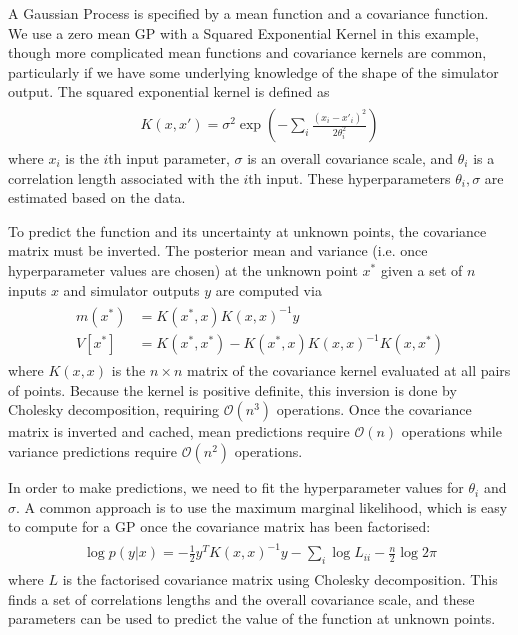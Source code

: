 \documentclass[openacc]{rstransa}%
\begin{document}
A Gaussian Process is specified by a mean function and a covariance function.
We use a zero mean GP with a Squared Exponential Kernel in this
example, though more complicated mean functions and covariance kernels are common, particularly
if we have some underlying knowledge of the shape of the simulator output.
The squared exponential kernel is defined as
\begin{align}\label{sqexp}
\begin{split}
K(x, x') = \sigma^2 \exp\left(-\sum_i \frac{(x_i - x'_i)^2}{2 \theta_i^2}\right)
\end{split}
\end{align}
where $x_i$ is the $i$th input parameter, $\sigma$ is an overall covariance scale, and $\theta_i$
is a correlation length associated with the $i$th input. These hyperparameters $\theta_i, \sigma$
are estimated based on the data.

To predict the function and its uncertainty at unknown points, the covariance matrix must be inverted.
The posterior mean and variance (i.e. once hyperparameter values are chosen) at the unknown point
$x^*$ given a set of $n$ inputs $x$ and simulator outputs $y$ are computed via
\begin{align}\label{predict}
\begin{split}
m(x^*) &= K(x^*, x) K(x, x)^{-1} y \\
V[x^*] &= K(x^*, x^*) - K(x^*, x) K(x, x)^{-1} K(x, x^*)
\end{split}
\end{align}
where $K(x,x)$ is the $n \times n$ matrix of the covariance kernel evaluated at all pairs of points.
Because the kernel is positive definite, this inversion is done by Cholesky decomposition, requiring
$\mathcal O(n^3)$ operations. Once the covariance matrix is inverted and cached, mean predictions require $\mathcal O(n)$
operations while variance predictions require $\mathcal O(n^2)$ operations.

In order to make predictions, we need to fit the hyperparameter values for $\theta_i$ and $\sigma$.
A common approach is to use the maximum marginal likelihood, which is easy to compute for a GP once
the covariance matrix has been factorised:
\begin{align}\label{loglike}
\begin{split}
\log p(y|x) = -\frac{1}{2} y^T K(x, x)^{-1} y - \sum_i \log L_{ii} - \frac{n}{2}\log 2\pi
\end{split}
\end{align}
where $L$ is the factorised covariance matrix using Cholesky decomposition.
This finds a set of correlations lengths and the overall covariance scale, and these parameters
can be used to predict the value of the function at unknown points.
\end{document}
